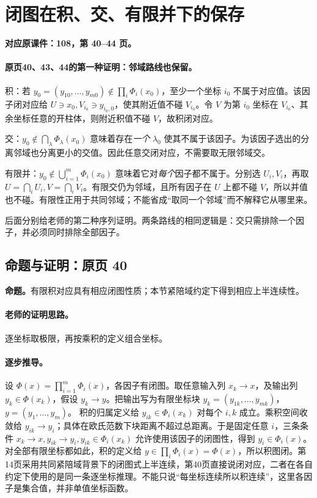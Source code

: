 \documentclass[11pt,a4paper]{article}
\theoremstyle{definition}\newtheorem{definition}{定义}\newtheorem{example}{例}
\begin{document}
\clearpage\section{闭图在积、交、有限并下的保存}\label{g:108:40}

\textbf{对应原课件：108，第 40--44 页。}


\paragraph{原页40、43、44的第一种证明：邻域路线也保留。}
积：若 $y_0=(y_{10},\ldots,y_{m0})\notin\prod_i\Phi_i(x_0)$，至少一个坐标 $i_0$ 不属于对应值。该因子闭对应给 $U\ni x_0,V_{i_0}\ni y_{i_0,0}$，使其附近值不碰 $V_{i_0}$。令 $V$ 为第 $i_0$ 坐标在 $V_{i_0}$、其余坐标任意的开柱体，则附近积值不碰 $V$，故积闭对应。

交：$y_0\notin\bigcap_\lambda\Phi_\lambda(x_0)$ 意味着存在\emph{一个} $\lambda_0$ 使其不属于该因子。为该因子选出的分离邻域也分离更小的交值。因此任意交闭对应，不需要取无限邻域交。

有限并：$y_0\notin\bigcup_{i=1}^m\Phi_i(x_0)$ 意味着它对\emph{每个}因子都不属于。分别选 $U_i,V_i$，再取 $U=\bigcap_iU_i,V=\bigcap_iV_i$。有限交仍为邻域，且所有因子在 $U$ 上都不碰 $V$，所以并值也不碰。有限性正用于共同邻域；不能省成“取同一个邻域”而不解释它从哪里来。

后面分别给老师的第二种序列证明。两条路线的相同逻辑是：交只需排除一个因子，并必须同时排除全部因子。


\subsection{命题与证明：原页 40}

\textbf{命题。}有限积对应具有相应闭图性质；本节紧陪域约定下得到相应上半连续性。

\paragraph{老师的证明思路。}逐坐标取极限，再按乘积的定义组合坐标。

\paragraph{逐步推导。}
设 $\Phi(x)=\prod_{i=1}^m\Phi_i(x)$，各因子有闭图。取任意输入列 $x_k\to x$，及输出列 $y_k\in\Phi(x_k)$，假设 $y_k\to y$。把输出写为有限坐标块 $y_k=(y_{1k},\ldots,y_{mk})$，$y=(y_1,\ldots,y_m)$。
积的归属定义给 $y_{ik}\in\Phi_i(x_k)$ 对每个 $i,k$ 成立。乘积空间收敛给 $y_{ik}\to y_i$；具体在欧氏范数下块距离不超过总距离。于是固定任意 $i$，三条条件 $x_k\to x,y_{ik}\to y_i,y_{ik}\in\Phi_i(x_k)$ 允许使用该因子的闭图性，得到 $y_i\in\Phi_i(x)$。
对全部有限坐标都如此，积的定义给 $y\in\prod_i\Phi_i(x)=\Phi(x)$，所以积图闭。第14页采用共同紧陪域背景下的闭图式上半连续，第40页直接说闭对应，二者在各自约定下使用的是同一条逐坐标推理。不能只说“每坐标连续所以积连续”，这里各因子是集合值，并非单值坐标函数。
\end{document}
